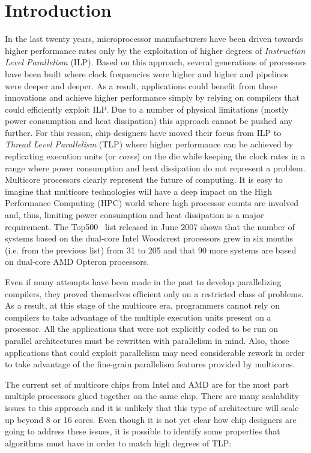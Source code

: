 \documentclass{article}
\begin{document}
\section{Introduction}
\label{sec:intro}
In the last twenty years, microprocessor manufacturers have been
driven towards higher performance rates only by the exploitation of
higher degrees of {\em Instruction Level Parallelism} (ILP). Based on
this approach, several generations of processors have been built where
clock frequencies were higher and higher and pipelines were deeper and
deeper. As a result, applications could benefit from these innovations
and achieve higher performance simply by relying on compilers that
could efficiently exploit ILP. Due to a number of physical limitations
(mostly power consumption and heat dissipation) this approach cannot
be pushed any further. For this reason, chip designers have moved
their focus from ILP to {\em Thread Level Parallelism} (TLP) where
higher performance can be achieved by replicating execution units (or
{\em cores}) on the die while keeping the clock rates in a range where
power consumption and heat dissipation do not represent a
problem. Multicore processors clearly represent the future of
computing. It is easy to imagine that multicore technologies will have
a deep impact on the High Performance Computing (HPC) world where high
processor counts are involved and, thus, limiting power consumption
and heat dissipation is a major requirement. The Top500~\cite{top500}
list released in June 2007 shows that the number of systems based on
the dual-core Intel Woodcrest processors grew in six months (i.e. from
the previous list) from 31 to 205 and that 90 more systems are based
on dual-core AMD Opteron processors.

Even if many attempts have been made in the past to develop
parallelizing compilers, they proved themselves efficient only on a
restricted class of problems. As a result, at this stage of the
multicore era, programmers cannot rely on compilers to take advantage
of the multiple execution units present on a processor. All the
applications that were not explicitly coded to be run on parallel
architectures must be rewritten with parallelism in mind. Also, those
applications that could exploit parallelism may need considerable
rework in order to take advantage of the fine-grain parallelism
features provided by multicores.

The current set of multicore chips from Intel and AMD are for the most
part multiple processors glued together on the same chip. There are
many scalability issues to this approach and it is unlikely that this
type of architecture will scale up beyond 8 or 16 cores. Even though
it is not yet clear how chip designers are going to address these
issues, it is possible to identify some properties that algorithms
must have in order to match high degrees of TLP:
\end{document}
